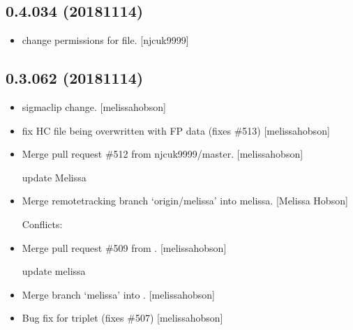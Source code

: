 \documentclass[a4paper,10pt,english]{report}
\begin{document}
\subsection{0.4.034 (2018\sphinxhyphen{}11\sphinxhyphen{}14)}
\label{\detokenize{misc/changelog:id279}}\begin{itemize}
\item {} 
 \sphinxhyphen{} change permissions for file. {[}njcuk9999{]}

\end{itemize}


\subsection{0.3.062 (2018\sphinxhyphen{}11\sphinxhyphen{}14)}
\label{\detokenize{misc/changelog:id280}}\begin{itemize}
\item {} 
 sigma\sphinxhyphen{}clip change. {[}melissa\sphinxhyphen{}hobson{]}

\item {} 
 \sphinxhyphen{} fix HC file being overwritten with FP data (fixes
\#513) {[}melissa\sphinxhyphen{}hobson{]}

\item {} 
Merge pull request \#512 from njcuk9999/master. {[}melissa\sphinxhyphen{}hobson{]}

update Melissa

\item {} 
Merge remote\sphinxhyphen{}tracking branch ‘origin/melissa’ into melissa. {[}Melissa
Hobson{]}
\begin{description}
\item[{Conflicts:}] \leavevmode
{}

\end{description}

\item {} 
Merge pull request \#509 from . {[}melissa\sphinxhyphen{}hobson{]}

update melissa

\item {} 
Merge branch ‘melissa’ into . {[}melissa\sphinxhyphen{}hobson{]}

\item {} 
Bug fix for  triplet (fixes \#507) {[}melissa\sphinxhyphen{}hobson{]}

\end{itemize}
\end{document}
